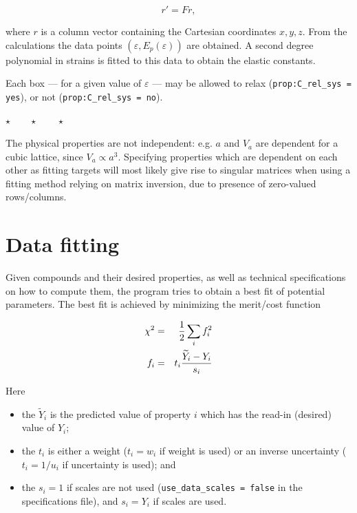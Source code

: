 \documentclass[a4paper,12pt,pdftex,onecolumn]{article}
\newcommand{\stars}{\begin{center}%
\vspace{1em plus 0.5em minus 0.5em}%
$\star \qquad \star \qquad \star$%
\vspace{1em plus 0.5em minus 0.5em}%
\end{center}}
\begin{document}
\begin{equation}
r' = F r,
\end{equation}

where $r$ is a column vector containing the Cartesian coordinates $x,y,z$.
From the calculations the data points $(\varepsilon, E_p(\varepsilon))$ are obtained.
A second degree polynomial in strains is fitted to this data to obtain the elastic
constants.

Each box --- for a given value of $\varepsilon$ --- may be allowed to
relax (\verb+prop:C_rel_sys = yes+), or not (\verb+prop:C_rel_sys = no+).

\stars

The physical properties are not independent: e.g. $a$ and $V_a$ are dependent
for a cubic lattice, since $V_a \propto a^3$. Specifying properties which are
dependent on each other as fitting targets will most likely give rise to
singular matrices when using a fitting method relying on matrix inversion,
due to presence of zero-valued rows/columns.







\section{Data fitting}

Given compounds and their desired properties, as well as technical specifications
on how to compute them, the program tries to obtain a best fit of potential
parameters. The best fit is achieved by minimizing the merit/cost function

\begin{eqnarray}
\chi^2 &=& {1 \over 2} \sum_i f_i^2 \\
f_i &=& t_i {\widetilde{Y}_i - Y_i \over s_i}
\end{eqnarray}

Here

\begin{itemize}
\item the $\widetilde{Y}_i$ is the predicted value of property $i$
which has the read-in (desired) value of $Y_i$;
\item the $t_i$ is either a weight ($t_i=w_i$ if weight is used)
or an inverse uncertainty ($t_i=1/u_i$ if uncertainty is used); and
\item the $s_i = 1$ if scales are not used (\verb+use_data_scales = false+ in the
specifications file), and $s_i = Y_i$ if scales are used.
\end{itemize}
\end{document}
